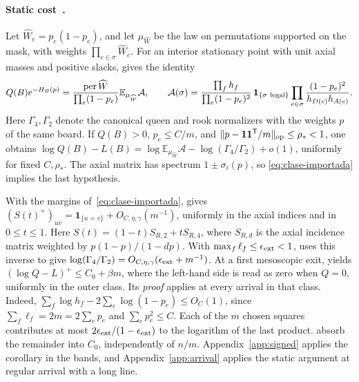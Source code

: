\paragraph{Static cost~\cite[Lemmas 6.5--6.6, Prop.~6.7 and Cor.~6.8]{tc}.} Let \(\widehat W_e=p_e(1-p_e)\),
and let \(\mu_{\widehat W}\) be the law on permutations supported on the mask, with weights
\(\prod_{e\in\sigma}\widehat W_e\). For an interior stationary point with unit axial masses and positive
slacks, \cite[Lemma~6.5]{tc} gives the identity
\[
 Q(B)e^{-H_B(p)}=\frac{\operatorname{per}\widehat W}{\prod_e(1-p_e)}
                  \mathbb E_{\mu_{\widehat W}}\mathcal A,\qquad
 \mathcal A(\sigma)=
 \frac{\prod_f h_f}{\prod_e(1-p_e)^2}\,\mathbf1_{\{\sigma\ {\rm legal}\}}
 \prod_{e\in\sigma}\frac{(1-p_e)^2}{h_{D(e)}h_{A(e)}} .
\]
Here \(\Gamma_4,\Gamma_2\) denote the canonical queen and rook normalizers with the weights \(p\) of the
same board. If \(Q(B)>0\), \(p_e\le C/m\), and \(\|p-\mathbf1\mathbf1^{\mathsf T}/m\|_{\rm
op}\le\rho_*<1\), one obtains \(\log Q(B)-L(B)=\log\mathbb E_{\mu_{\widehat W}}\mathcal A
-\log(\Gamma_4/\Gamma_2)+o(1)\), uniformly for fixed \(C,\rho_*\). The axial matrix has spectrum
\(1\pm\sigma_i(p)\), so \eqref{eq:clase-importada} implies the last hypothesis.

With the margins of~\eqref{eq:clase-importada}, \cite[Lemma~6.6]{tc} gives
\((S(t)^+)_{uv}=\mathbf1_{\{u=v\}}+O_{C,\eta,\gamma}(m^{-1})\), uniformly in the axial indices and in
\(0\le t\le1\). Here \(S(t)=(1-t)S_{R,2}+tS_{R,4}\), where \(S_{R,d}\) is the axial incidence matrix
weighted by \(p(1-p)/(1-dp)\). With \(\max_f\ell_f\le\epsilon_{\rm ext}<1\), \cite[Prop.~6.7]{tc} uses this
inverse to give \(\log(\Gamma_4/\Gamma_2)=O_{C,\eta,\gamma}(\epsilon_{\rm ext}+m^{-1})\). At a first
mesoscopic exit, \cite[Cor.~6.8]{tc} yields \((\log Q-L)^+\le C_0+\beta m\), where the left-hand side is
read as zero when \(Q=0\), uniformly in the outer class. Its \emph{proof} applies at every arrival in that
class. Indeed, \(\sum_f\log h_f-2\sum_e\log(1-p_e)\le O_C(1)\), since \(\sum_f\ell_f=2m=2\sum_e p_e\) and
\(\sum_ep_e^2\le C\). Each of the \(m\) chosen squares contributes at most \(2\epsilon_{\rm
ext}/(1-\epsilon_{\rm ext})\) to the logarithm of the last product. \cite[Lemmas~6.5--6.6 and Prop.~6.7]{tc}
absorb the remainder into \(C_0\), independently of \(n/m\). Appendix~\ref{app:signed} applies the corollary
in the bands, and Appendix~\ref{app:arrival} applies the static argument at regular arrival with a long
line.
